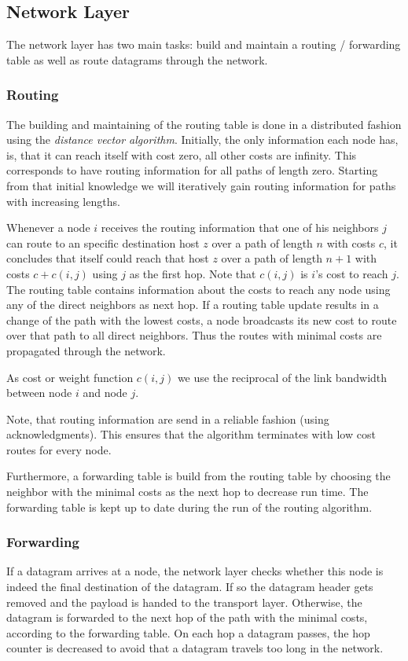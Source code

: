 \newpage

\subsection{Network Layer}

  The network layer has two main tasks: build and maintain a routing / forwarding table as well as route datagrams through the network. 

  \subsubsection{Routing}
  The building and maintaining of the routing table is done in a distributed fashion using the \emph{distance vector algorithm}. Initially, the only information each node has, is, that it can reach itself with cost zero, all other costs are infinity. This corresponds to have routing information for all paths of length zero. Starting from that initial knowledge we will iteratively gain routing information for paths with increasing lengths.

  Whenever a node $i$ receives the routing information that one of his neighbors $j$ can route to an specific destination host $z$ over a path of length $n$ with costs $c$, it concludes that itself could reach that host $z$ over a path of length $n+1$ with costs $c+c(i,j)$ using $j$ as the first hop. Note that $c(i,j)$ is $i$'s cost to reach $j$. The routing table contains information about the costs to reach any node using any of the direct neighbors as next hop. If a routing table update results in a change of the path with the lowest costs, a node broadcasts its new cost to route over that path to all direct neighbors. Thus the routes with minimal costs are propagated through the network.

  As cost or weight function $c(i,j)$ we use the reciprocal of the link bandwidth between node $i$ and node $j$.

  Note, that routing information are send in a reliable fashion (using acknowledgments). This ensures that the algorithm terminates with low cost routes for every node.

  Furthermore, a forwarding table is build from the routing table by choosing the neighbor with the minimal costs as the next hop to decrease run time. The forwarding table is kept up to date during the run of the routing algorithm.

  \subsubsection{Forwarding}
  If a datagram arrives at a node, the network layer checks whether this node is indeed the final destination of the datagram. If so the datagram header gets removed and the payload is handed to the transport layer. Otherwise, the datagram is forwarded to the next hop of the path with the minimal costs, according to the forwarding table. On each hop a datagram passes, the hop counter is decreased to avoid that a datagram travels too long in the network.


